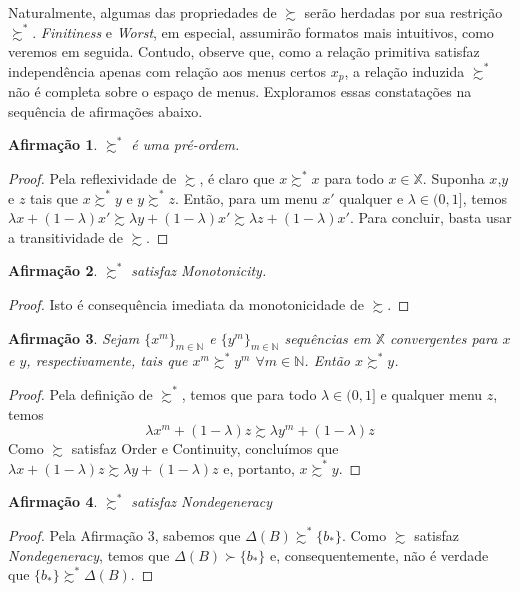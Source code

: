 \documentclass[11pt, a4paper]{article}
\theoremstyle{nonumberplain}
\newtheorem{proof}{Dem.}
\theoremstyle{plain}
\theoremstyle{plain}
\newtheorem{claim}{Afirmação}
\theoremstyle{plain}
\begin{document}
Naturalmente, algumas das propriedades de $\succsim$ serão herdadas por sua restrição $\succsim^*$. \textit{Finitiness} e \textit{Worst}, em especial, assumirão formatos mais intuitivos, como veremos em seguida. Contudo, observe que, como a relação primitiva satisfaz independência apenas com relação aos menus certos $x_p$, a relação induzida $\succsim^*$ não é completa sobre o espaço de menus. Exploramos essas constatações na sequência de afirmações abaixo.


\begin{claim}$\succsim^*$ é uma pré-ordem. \end{claim}
\begin{proof} Pela reflexividade de $\succsim$, é claro que $x\succsim^* x$ para todo $x\in \mathbb{X}$. Suponha $x$,$y$ e $z$ tais que $x\succsim^* y$ e $y\succsim^* z$. Então, para um menu $x'$ qualquer e $\lambda\in(0,1]$, temos $\lambda x + (1-\lambda)x'\succsim \lambda y + (1-\lambda)x'\succsim \lambda z + (1-\lambda)x'$. Para concluir, basta usar a transitividade de $\succsim$.
\end{proof}


\begin{claim}\label{monotonicidade}$\succsim^*$ satisfaz Monotonicity. \end{claim}
\begin{proof}
Isto é consequência imediata da monotonicidade de $\succsim$.    
\end{proof}

\begin{claim}\label{continuidade} Sejam $\{x^m\}_{m\in\mathbb{N}}$ e $\{y^m\}_{m\in\mathbb{N}}$ sequências em $\mathbb{X}$ convergentes para $x$ e $y$, respectivamente, tais que $x^m\succsim^* y^m$ $\forall m\in \mathbb{N}$. Então $x\succsim^* y$.\end{claim}
\begin{proof}
Pela definição de $\succsim^*$, temos que para todo $\lambda\in (0,1]$ e qualquer menu $z$, temos $$\lambda x^m + (1-\lambda)z \succsim \lambda y^m + (1-\lambda)z$$ Como $\succsim$ satisfaz Order e Continuity, concluímos que $\lambda x + (1-\lambda)z \succsim \lambda y + (1-\lambda)z$ e, portanto, $x\succsim^* y$.
\end{proof}

\begin{claim}$\succsim^*$ satisfaz \emph{Nondegeneracy}\end{claim}
\begin{proof}
Pela Afirmação 3, sabemos que $\Delta(B)\succsim^* \{b_*\}$. Como $\succsim$ satisfaz \emph{Nondegeneracy}, temos que $\Delta(B)\succ \{b_*\}$ e, consequentemente, não é verdade que $\{b_*\}\succsim^*\Delta(B)$.
\end{proof}
\end{document}
